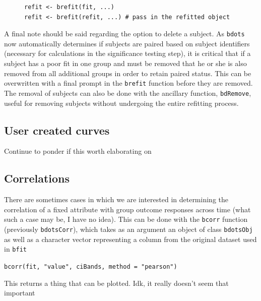 \documentclass{article}
\newcommand{\xt}{\texttt}%
\begin{document}
\begin{singlespace}
\begin{figure}[H]
\centering
\begin{BVerbatim}
refit <- brefit(fit, ...)
refit <- brefit(refit, ...) # pass in the refitted object
\end{BVerbatim}
\end{figure}
\end{singlespace}



A final note should be said regarding the option to delete a subject. As \xt{bdots} now automatically determines if subjects are paired based on subject identifiers (necessary for  calculations in the significance testing step), it is critical that if a subject has a poor fit in one group and must be removed that he or she is also removed from all additional groups in order to retain paired status. This can be overwritten with a final prompt in the \texttt{brefit} function before they are removed. The removal of subjects can also be done with the ancillary function, \texttt{bdRemove}, useful for removing subjects without undergoing the entire refitting process. 


\subsection{User created curves}

Continue to ponder if this worth elaborating on

\subsection{Correlations}

There are sometimes cases in which we are interested in determining the correlation of a fixed attribute with group outcome responses across time (what such a case may be, I have no idea). This can be done with the \texttt{bcorr} function (previously \texttt{bdotsCorr}), which takes as an argument an object of class \texttt{bdotsObj} as well as a character vector representing a column from the original dataset used in \texttt{bfit}

\begin{center}
\texttt{bcorr(fit, "value", ciBands, method = "pearson")} 
\end{center}

This returns a thing that can be plotted. Idk, it really doesn't seem that important 
\end{document}
